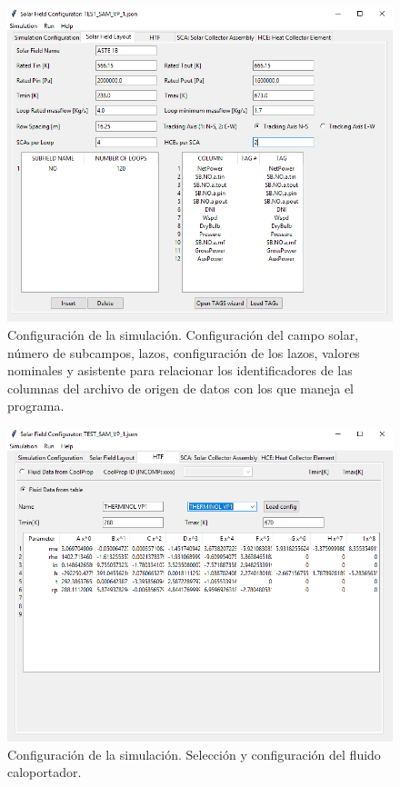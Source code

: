 \documentclass[12pt]{report} %
\begin{document}
\begin{figure}
\includegraphics[scale=0.8]{images/interface02.png}
\caption{Configuración de la simulación. Configuración del campo solar, número de subcampos, lazos, configuración de los lazos, valores nominales y asistente para relacionar los identificadores de las columnas del archivo de origen de datos con los que maneja el programa.} 
\label{fig:interface02}
\end{figure}

\begin{figure}
\includegraphics[scale=0.8]{images/interface03.png}
\caption{Configuración de la simulación. Selección y configuración del fluido caloportador.} 
\label{fig:interface03}
\end{figure}
\end{document}
